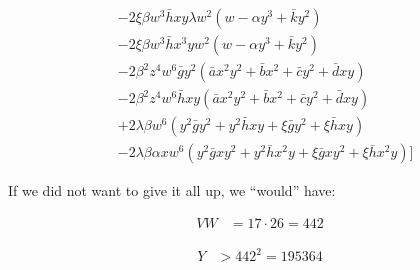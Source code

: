 \documentclass[12pt]{article}
\numberwithin{table}{section}
\begin{document}
\begin{align}
&-2 \xi\beta w^3 \bar h x y\lambda w^2 (  w - \alpha y^3  + \bar k y^2 ) \\
&-2 \xi\beta w^3 \bar h x^3 y w^2 (  w - \alpha y^3  + \bar k y^2 ) \\
&-2 \beta^2 z^4w^6\bar g y^2 (\bar a x^2 y^2 + \bar b x^2 + \bar c y^2 + \bar d xy ) \\
&-2 \beta^2 z^4w^6\bar h x y (\bar a x^2 y^2 + \bar b x^2 + \bar c y^2 + \bar d xy ) \\
&+ 2 \lambda \beta w^6 (y^2 \bar g y^2 + y^2 \bar h x y + \xi \bar g y^2 + \xi \bar h x y) \\
&- 2 \lambda \beta \alpha x w^6 (y^2 \bar g xy^2 + y^2 \bar h x^2 y + \xi \bar g xy^2 + \xi \bar h x^2 y)\biggr]
\end{align}

If we did not want to give it all up, we ``would'' have:

\begin{align}
VW &= 17\cdot 26 = 442
\end{align}

\begin{align}
Y &> 442^2 = 195364
\end{align}
\end{document}
